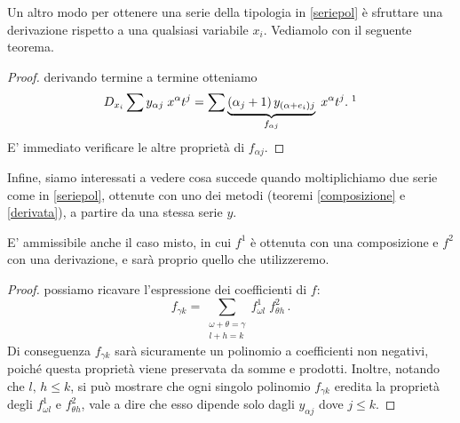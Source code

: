 Un altro modo per ottenere una serie della tipologia in \eqref{seriepol} è sfruttare una derivazione rispetto a una qualsiasi variabile $x_i$. Vediamolo con il seguente teorema.
\begin{theorem}[derivazione]\label{derivata}
\end{theorem}
\begin{proof} derivando termine a termine otteniamo
$$ D_{x_i} \sum y_{\alpha j} \; x^\alpha t^j = \sum  \underbrace{(\alpha_j+1) \, y_{(\alpha+e_i)j}}_{f_{\alpha j}} \; x^\alpha t^j. \; \footnotemark$$ 
E' immediato verificare le altre proprietà di $f_{\alpha j}$.
\end{proof}

Infine, siamo interessati a vedere cosa succede quando moltiplichiamo due serie come in \eqref{seriepol}, ottenute con uno dei metodi (teoremi \ref{composizione} e \ref{derivata}), a partire da una stessa serie $y$.
\begin{theorem}
\end{theorem}

\begin{remark}
E' ammissibile anche il caso misto, in cui $f^1$ è ottenuta con una composizione e $f^2$ con una derivazione, e sarà proprio quello che utilizzeremo.
\end{remark}

\begin{proof} possiamo ricavare l'espressione dei coefficienti di $f$:
$$f_{\gamma k} = \sum_{\substack{\omega+\theta=\gamma \\ l+h=k}} f^1_{\omega l}\;  f^2_{\theta h}\, .$$
Di conseguenza $f_{\gamma k}$ sarà sicuramente un polinomio a coefficienti non negativi, poiché questa proprietà viene preservata da somme e prodotti. Inoltre, notando che $l,\, h \leq k$, si può mostrare che ogni singolo polinomio $f_{\gamma k}$ eredita la proprietà degli $f^1_{\omega l}$ e $f^2_{\theta h}$, vale a dire che esso dipende solo dagli $y_{\alpha j}$ dove $j \leq k$.
\end{proof}

